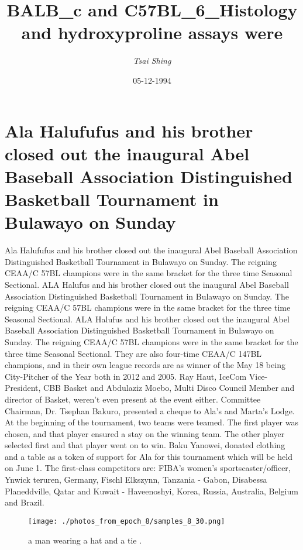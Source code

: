 \documentclass{article}%
\title{BALB\_c and C57BL\_6\_Histology and hydroxyproline assays were}%
\author{\textit{Tsai Shing}}%
\date{05-12-1994}%
\begin{document}
%
\normalsize%
\maketitle%
\section{Ala Halufufus and his brother closed out the inaugural Abel Baseball Association Distinguished Basketball Tournament in Bulawayo on Sunday}%
\label{sec:AlaHalufufusandhisbrotherclosedouttheinauguralAbelBaseballAssociationDistinguishedBasketballTournamentinBulawayoonSunday}%
Ala Halufufus and his brother closed out the inaugural Abel Baseball Association Distinguished Basketball Tournament in Bulawayo on Sunday. The reigning CEAA/C 57BL champions were in the same bracket for the three time Seasonal Sectional.\newline%
ALA Halufus and his brother closed out the inaugural Abel Baseball Association Distinguished Basketball Tournament in Bulawayo on Sunday. The reigning CEAA/C 57BL champions were in the same bracket for the three time Seasonal Sectional.\newline%
ALA Halufus and his brother closed out the inaugural Abel Baseball Association Distinguished Basketball Tournament in Bulawayo on Sunday. The reigning CEAA/C 57BL champions were in the same bracket for the three time Seasonal Sectional.\newline%
They are also four{-}time CEAA/C 147BL champions, and in their own league records are as winner of the May 18 being City{-}Pitcher of the Year both in 2012 and 2005.\newline%
Ray Haut, IceCom Vice{-}President, CBB Basket and Abdulaziz Moebo, Multi Disco Council Member and director of Basket, weren't even present at the event either.\newline%
Committee Chairman, Dr. Tsephan Bakuro, presented a cheque to Ala's and Marta's Lodge.\newline%
At the beginning of the tournament, two teams were teamed. The first player was chosen, and that player ensured a stay on the winning team. The other player selected first and that player went on to win.\newline%
Baku Yanowei, donated clothing and a table as a token of support for Ala for this tournament which will be held on June 1.\newline%
The first{-}class competitors are: FIBA's women's sportscaster/officer, Ynwick teruren, Germany, Fischl Elkszynn, Tanzania {-} Gabon, Disabessa Planeddville, Qatar and Kuwait {-} Haveenoshyi, Korea, Russia, Australia, Belgium and Brazil.\newline%

%


\begin{figure}[h!]%
\centering%
\texttt{[image: ./photos\_from\_epoch\_8/samples\_8\_30.png]}%
\caption{a man wearing a hat and a tie .}%
\end{figure}

%
\end{document}
